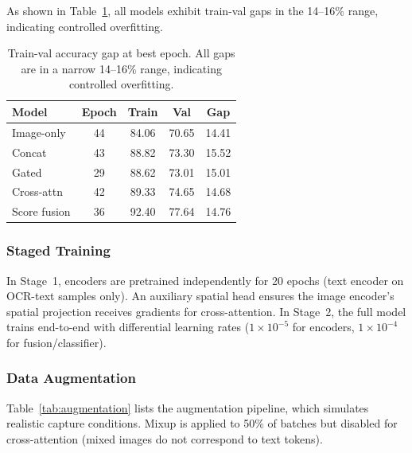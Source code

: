 \documentclass{article}
\begin{document}
\noindent As shown in Table~\ref{tab:overfitting}, all models exhibit train-val gaps in the 14--16\% range, indicating controlled overfitting.

\begin{table}[t]
\centering
\caption{Train-val accuracy gap at best epoch. All gaps are in a narrow 14--16\% range, indicating controlled overfitting.}
\label{tab:overfitting}
\small
\begin{tabular}{@{}lcccc@{}}
\toprule
\textbf{Model} & \textbf{Epoch} & \textbf{Train} & \textbf{Val} & \textbf{Gap} \\
\midrule
Image-only   & 44 & 84.06 & 70.65 & 14.41 \\
Concat       & 43 & 88.82 & 73.30 & 15.52 \\
Gated        & 29 & 88.62 & 73.01 & 15.01 \\
Cross-attn   & 42 & 89.33 & 74.65 & 14.68 \\
Score fusion & 36 & 92.40 & 77.64 & 14.76 \\
\bottomrule
\end{tabular}
\end{table}

\subsubsection{Staged Training}

In Stage~1, encoders are pretrained independently for 20 epochs (text encoder on OCR-text samples only). An auxiliary spatial head ensures the image encoder's spatial projection receives gradients for cross-attention. In Stage~2, the full model trains end-to-end with differential learning rates ($1 \times 10^{-5}$ for encoders, $1 \times 10^{-4}$ for fusion/classifier).

\subsubsection{Data Augmentation}

Table~\ref{tab:augmentation} lists the augmentation pipeline, which simulates realistic capture conditions. Mixup \citep{zhang2018mixup} is applied to 50\% of batches but disabled for cross-attention (mixed images do not correspond to text tokens).
\end{document}
